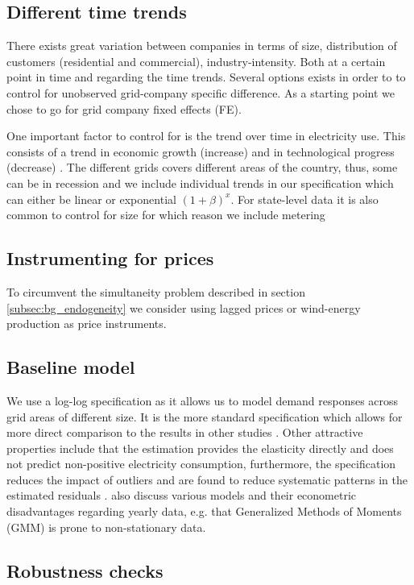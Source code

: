 \label{sec:empirical}
\subsection{Different time trends}
\label{subsec:e_trends}
There exists great variation between companies in terms of size, distribution of customers (residential and commercial), industry-intensity. Both at a certain point in time and regarding the time trends. Several options exists in order to to control for unobserved grid-company specific difference. As a starting point we chose to go for grid company fixed effects (FE).
\par
One important factor to control for is the trend over time in electricity use. This consists of a trend in economic growth (increase) and in technological progress (decrease) \citep{lijesen2007real}. The different grids covers different areas of the country, thus, some can be in recession and we include individual trends in our specification which can either be linear or exponential $(1+\beta)^x$. For state-level data it is also common to control for size \citep{burke2017price} for which reason we include metering 


\subsection{Instrumenting for prices}
\label{subsec:instruments}
To circumvent the simultaneity problem described in section \ref{subsec:bg_endogeneity} we consider using lagged prices or wind-energy production as price instruments.

\subsection{Baseline model}
\label{subsec:model}
We use a log-log specification as it allows us to model demand responses across grid areas of different size. It is the more standard specification which allows for more direct comparison to the results in other studies \citep{burke2017price}. Other attractive properties include that the estimation provides the elasticity directly and does not predict non-positive electricity consumption, furthermore, the specification reduces the impact of outliers and are found to reduce systematic patterns in the estimated residuals \citep{burke2017price}. \citet{burke2017price}  also discuss various models and their econometric disadvantages regarding yearly data, e.g. that Generalized Methods of Moments (GMM) is prone to non-stationary data.


\subsection{Robustness checks}
\label{subsec:robustness}

